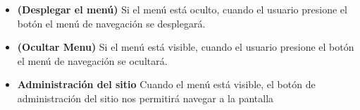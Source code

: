     \begin{itemize}
    
    \item {\bf \IUMenu (Desplegar el menú)}
        Si el menú está oculto, cuando el usuario presione el botón \IUMenu el menú de
        navegación se desplegará.

    \item {\bf \IUMenu (Ocultar Menu)}
        Si el menú está visible, cuando el usuario presione el botón \IUMenu el menú de
        navegación se ocultará.

    \item {\bf \IUAdminSitio Administración del sitio }
        Cuando el menú está visible, el botón de administración del sitio nos permitirá
        navegar a la pantalla 

    \end{itemize}
